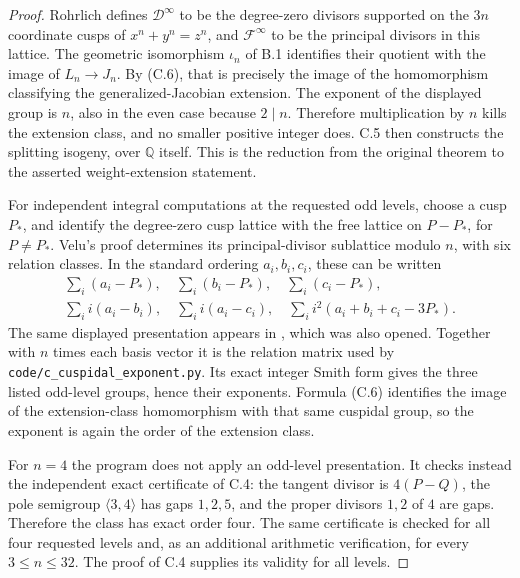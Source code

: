 \begin{proof}
Rohrlich defines \(\mathcal D^\infty\) to be the degree-zero divisors
supported on the \(3n\) coordinate cusps of \(x^n+y^n=z^n\), and
\(\mathcal F^\infty\) to be the principal divisors in this lattice.
The geometric isomorphism \(\iota_n\) of B.1 identifies their quotient
with the image of \(L_n\to J_n\). By (C.6), that is precisely the image
of the homomorphism classifying the generalized-Jacobian extension.
The exponent of the displayed group is \(n\), also in the even case
because \(2\mid n\). Therefore multiplication by \(n\) kills the
extension class, and no smaller positive integer does. C.5 then
constructs the splitting isogeny, over \(\mathbb Q\) itself.
This is the reduction from the original theorem to the asserted
weight-extension statement.

For independent integral computations at the requested odd levels,
choose a cusp
\(P_*\), and identify the degree-zero cusp lattice with the
free lattice on \(P-P_*\), for \(P\ne P_*\).
Velu's proof determines its principal-divisor sublattice modulo
\(n\), with six relation classes. In the standard ordering
\(a_i,b_i,c_i\), these can be written
\[
\begin{gathered}
 \sum_i(a_i-P_*),\quad \sum_i(b_i-P_*),\quad
 \sum_i(c_i-P_*),\\
 \sum_i i(a_i-b_i),\quad \sum_i i(a_i-c_i),\quad
 \sum_i i^2(a_i+b_i+c_i-3P_*).
\end{gathered}
\]
The same displayed presentation appears in
\cite[Theorem 29]{BanerjeeMerel2022}, which was also opened.
Together with \(n\) times each basis vector it is the relation
matrix used by \texttt{code/c\_cuspidal\_exponent.py}.
Its exact integer Smith form gives the three listed odd-level
groups, hence their exponents. Formula (C.6) identifies the image
of the extension-class homomorphism with that same cuspidal group,
so the exponent is again the order of the extension class.

For \(n=4\) the program does not apply an odd-level presentation.
It checks instead the independent exact certificate of C.4:
the tangent divisor is \(4(P-Q)\), the pole semigroup
\(\langle3,4\rangle\) has gaps \(1,2,5\), and the proper divisors
\(1,2\) of \(4\) are gaps. Therefore the class has exact order
four. The same certificate is checked for all four requested
levels and, as an additional arithmetic verification, for every
\(3\le n\le32\). The proof of C.4 supplies its validity for all
levels.
\end{proof}

